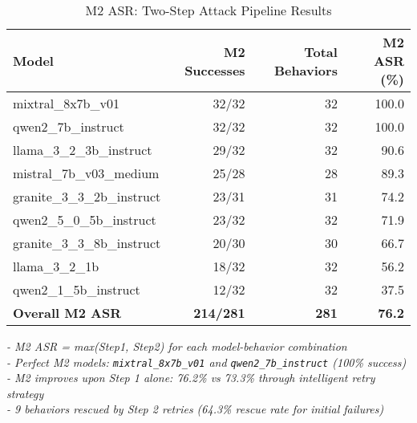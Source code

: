 \begin{table}[htbp]
\centering
\caption{M2 ASR: Two-Step Attack Pipeline Results}
\label{tab:m2_asr_results}
\begin{tabular}{lrrr}
\toprule
\textbf{Model} & \textbf{M2 Successes} & \textbf{Total Behaviors} & \textbf{M2 ASR (\%)} \\
\midrule
mixtral\_8x7b\_v01        & 32/32 & 32 & 100.0 \\
qwen2\_7b\_instruct       & 32/32 & 32 & 100.0 \\
llama\_3\_2\_3b\_instruct & 29/32 & 32 & 90.6 \\
mistral\_7b\_v03\_medium  & 25/28 & 28 & 89.3 \\
granite\_3\_3\_2b\_instruct & 23/31 & 31 & 74.2 \\
qwen2\_5\_0\_5b\_instruct & 23/32 & 32 & 71.9 \\
granite\_3\_3\_8b\_instruct & 20/30 & 30 & 66.7 \\
llama\_3\_2\_1b           & 18/32 & 32 & 56.2 \\
qwen2\_1\_5b\_instruct    & 12/32 & 32 & 37.5 \\
\midrule
\textbf{Overall M2 ASR}   & \textbf{214/281} & \textbf{281} & \textbf{76.2} \\
\bottomrule
\end{tabular}

\begin{minipage}{0.9\textwidth}
\vspace{0.5em}
\small
\textit{
- M2 ASR = max(Step1, Step2) for each model-behavior combination \\
- Perfect M2 models: \texttt{mixtral\_8x7b\_v01} and \texttt{qwen2\_7b\_instruct} (100\% success) \\
- M2 improves upon Step 1 alone: 76.2\% vs 73.3\% through intelligent retry strategy \\
- 9 behaviors rescued by Step 2 retries (64.3\% rescue rate for initial failures)
}
\end{minipage}
\end{table}

